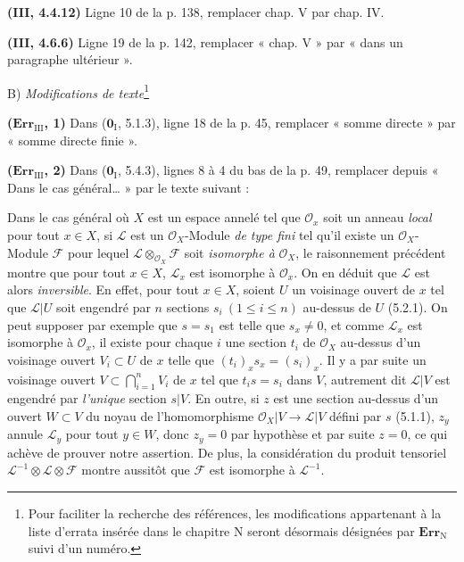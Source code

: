 \noindent\textbf{(III, 4.4.12)} Ligne 10 de la p. 138, remplacer chap. V par
chap. IV.

\noindent\textbf{(III, 4.6.6)} Ligne 19 de la p. 142, remplacer « chap. V » par
« dans un paragraphe ultérieur ».

\begin{center}
B) \emph{Modifications de texte}\footnote{Pour faciliter la recherche des
références, les modifications appartenant à la liste d'errata insérée dans le
chapitre N seront désormais désignées par $\mathbf{Err}_{\mathrm N}$ suivi d'un
numéro.}
\end{center}

\noindent\textbf{($\mathbf{Err}_{\mathrm{III}}$, 1)} Dans
($\mathbf{0}_{\mathrm I}$, 5.1.3), ligne 18 de la p. 45, remplacer « somme directe »
par « somme directe finie ».

\noindent\textbf{($\mathbf{Err}_{\mathrm{III}}$, 2)} Dans
($\mathbf{0}_{\mathrm I}$, 5.4.3), lignes 8 à 4 du bas de la p. 49, remplacer depuis
« Dans le cas général\ldots{} » par le texte suivant :

Dans le cas général où $X$ est un espace annelé tel que $\mathscr O_x$ soit un
anneau \emph{local} pour
tout $x\in X$, si $\mathscr L$ est un $\mathscr O_X$-Module \emph{de type fini}
tel qu'il existe un $\mathscr O_X$-Module $\mathscr F$ pour lequel
$\mathscr L\otimes_{\mathscr O_X}\mathscr F$ soit \emph{isomorphe à}
$\mathscr O_X$, le raisonnement précédent montre que pour tout $x\in X$,
$\mathscr L_x$ est isomorphe à $\mathscr O_x$. On en déduit que $\mathscr L$ est
alors \emph{inversible}. En effet, pour tout $x\in X$, soient $U$ un voisinage
ouvert de $x$ tel que $\mathscr L|U$ soit engendré par $n$ sections
$s_i\ (1\leq i\leq n)$ au-dessus de $U$ (5.2.1). On peut supposer par exemple
que $s=s_1$ est telle que $s_x\ne0$, et comme $\mathscr L_x$ est isomorphe à
$\mathscr O_x$, il existe pour chaque $i$ une section $t_i$ de $\mathscr O_X$
au-dessus d'un voisinage ouvert $V_i\subset U$ de $x$ telle que
$(t_i)_x s_x=(s_i)_x$. Il y a par suite un voisinage ouvert
$V\subset\bigcap_{i=1}^nV_i$ de $x$ tel que $t_i s=s_i$ dans $V$, autrement
dit $\mathscr L|V$ est engendré par \emph{l'unique} section $s|V$. En outre,
si $z$ est une section au-dessus d'un ouvert $W\subset V$ du noyau de
l'homomorphisme $\mathscr O_X|V\to\mathscr L|V$ défini par $s$ (5.1.1), $z_y$
annule $\mathscr L_y$ pour tout $y\in W$, donc $z_y=0$ par hypothèse et par
suite $z=0$, ce qui achève de prouver notre assertion. De plus, la
considération du produit tensoriel
$\mathscr L^{-1}\otimes\mathscr L\otimes\mathscr F$ montre aussitôt que
$\mathscr F$ est isomorphe à $\mathscr L^{-1}$.


